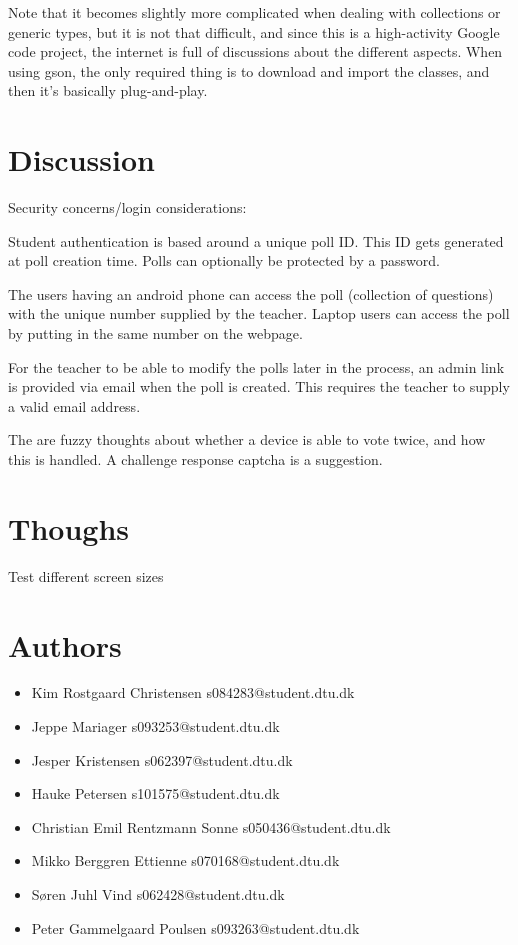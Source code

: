 \documentclass{acm_proc_article-sp}
\begin{document}
Note that it becomes slightly more complicated when dealing with collections or generic types, but it is not that difficult, and since this is a high-activity Google code project, the internet is full of discussions about the different aspects. When using gson, the only required thing is to download and import the classes, and then it's basically plug-and-play.

\balancecolumns
 
\section{Discussion}
 
Security concerns/login considerations:

Student authentication is based around a unique poll ID. This ID gets generated at poll creation time. Polls can optionally be protected by a password.

The users having an android phone can access the poll (collection of questions) with the unique number supplied by the teacher. Laptop users can access the poll by putting in the same number on the webpage.

For the teacher to be able to modify the polls later in the process, an admin link is provided via email when the poll is created. This requires the teacher to supply a valid email address.

The are fuzzy thoughts about whether a device is able to vote twice, and how this is handled. A challenge response captcha is a suggestion.


\appendix

\section{Thoughs}
Test different screen sizes

\section{Authors}
\begin{itemize}
\item Kim Rostgaard Christensen  s084283@student.dtu.dk
\item Jeppe Mariager s093253@student.dtu.dk
\item Jesper Kristensen s062397@student.dtu.dk
\item Hauke Petersen s101575@student.dtu.dk
\item Christian Emil Rentzmann Sonne s050436@student.dtu.dk
\item Mikko Berggren Ettienne s070168@student.dtu.dk
\item Søren Juhl Vind s062428@student.dtu.dk
\item Peter Gammelgaard Poulsen s093263@student.dtu.dk
\end{itemize}
\end{document}
